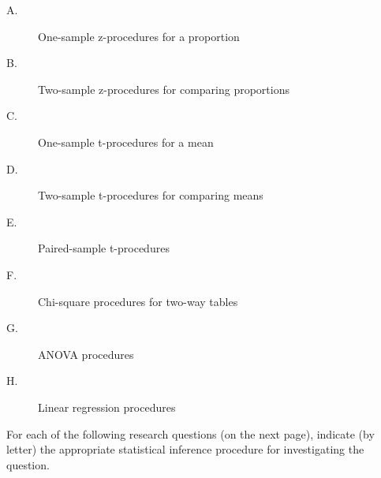 \begin{description}


\item[A.] One-sample z-procedures for a proportion


\item[B.] Two-sample z-procedures for comparing proportions


\item[C.] One-sample t-procedures for a mean


\item[D.] Two-sample t-procedures for comparing means


\item[E.] Paired-sample t-procedures


\item[F.] Chi-square procedures for two-way tables


\item[G.] ANOVA procedures


\item[H.] Linear regression procedures


\end{description}





For each of the following research questions (on the next page), indicate (by letter) the appropriate statistical inference procedure for investigating the question.




